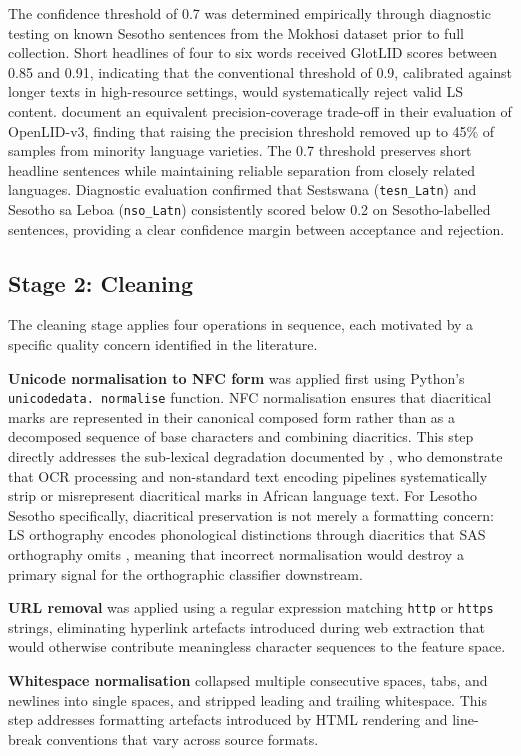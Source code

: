 \documentclass[12pt]{ThesisRU}
\begin{document}
The confidence threshold of 0.7 was determined empirically through diagnostic testing on known Sesotho sentences from the Mokhosi dataset prior to full collection. Short headlines of four to six words received GlotLID scores between 0.85 and 0.91, indicating that the conventional threshold of 0.9, calibrated against longer texts in high-resource settings, would systematically reject valid LS content. \citet{fedorova2026openlid} document an equivalent precision-coverage trade-off in their evaluation of OpenLID-v3, finding that raising the precision threshold removed up to 45\% of samples from minority language varieties. The 0.7 threshold preserves short headline sentences while maintaining reliable separation from closely related languages. Diagnostic evaluation confirmed that Sestswana (\texttt{tesn\_Latn}) and Sesotho sa Leboa (\texttt{nso\_Latn}) consistently scored below 0.2 on Sesotho-labelled sentences, providing a clear confidence margin between acceptance and rejection.
\subsection{Stage 2: Cleaning}
The cleaning stage applies four operations in sequence, each
motivated by a specific quality concern identified in the literature.

\textbf{Unicode normalisation to NFC form} was applied first using
Python's \texttt{unicodedata. normalise} function. NFC normalisation
ensures that diacritical marks are represented in their canonical
composed form rather than as a decomposed sequence of base characters
and combining diacritics. This step directly addresses the sub-lexical
degradation documented by \citet{de2007automatic}, who
demonstrate that OCR processing and non-standard text encoding
pipelines systematically strip or misrepresent diacritical marks in
African language text. For Lesotho Sesotho specifically, diacritical
preservation is not merely a formatting concern: LS orthography
encodes phonological distinctions through diacritics that SAS
orthography omits \citep{matlosa2017sesotho}, meaning that incorrect
normalisation would destroy a primary signal for the orthographic
classifier downstream.

\textbf{URL removal} was applied using a regular expression matching
\texttt{http} or \texttt{https} strings, eliminating hyperlink
artefacts introduced during web extraction that would otherwise
contribute meaningless character sequences to the feature space.

\textbf{Whitespace normalisation} collapsed multiple consecutive
spaces, tabs, and newlines into single spaces, and stripped leading
and trailing whitespace. This step addresses formatting artefacts
introduced by HTML rendering and line-break
conventions that vary across source formats.
\end{document}
